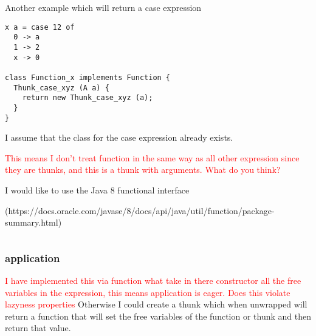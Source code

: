 \documentclass[12pt,a4paper,twoside]{article}
\begin{document}
Another example which will return a case expression

\begin{verbatim}
x a = case 12 of
  0 -> a
  1 -> 2
  x -> 0

class Function_x implements Function {
  Thunk_case_xyz (A a) {
    return new Thunk_case_xyz (a); 
  }
}
\end{verbatim}

I assume that the class for the case expression already exists.

\textcolor{red}{This means I don't treat function in the same way as all other expression since they are thunks, and this is a thunk with arguments.
 What do you think?}

I would like to use the Java 8 functional interface 

(https://docs.oracle.com/javase/8/docs/api/java/util/function/package-summary.html)



\begin{verbatim}

\end{verbatim}

\subsubsection{application}

\textcolor{red}{I have implemented this via function what take in there constructor all the free variables in the expression, this means application is eager. Does this
violate lazyness properties}
Otherwise I could create a thunk which when unwrapped will return a function that will set the free variables of the function or thunk and then return that value.
\end{document}
